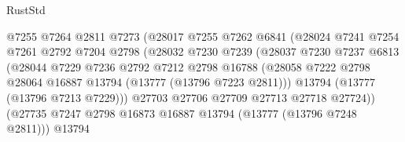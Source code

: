 \begin{lexlean}{RustStd}
\begin{coremodule}
                                    @7255
                                    @7264
                                    @2811
                                    @7273
                                    (@28017
                                      @7255
                                      @7262
                                      @6841
                                      (@28024
                                        @7241
                                        @7254
                                        @7261
                                        @2792
                                        @7204
                                        @2798
                                        (@28032
                                          @7230
                                          @7239
                                          (@28037
                                            @7230
                                            @7237
                                            @6813
                                            (@28044
                                              @7229
                                              @7236
                                              @2792
                                              @7212
                                              @2798
                                              @16788
                                              (@28058
                                                @7222
                                                @2798
                                                @28064
                                                @16887
                                                @13794
                                                (@13777 (@13796 @7223 @2811)))
                                              @13794
                                              (@13777 (@13796 @7213 @7229)))
                                            @27703
                                            @27706
                                            @27709
                                            @27713
                                            @27718
                                            @27724))
                                        (@27735
                                          @7247
                                          @2798
                                          @16873
                                          @16887
                                          @13794
                                          (@13777 (@13796 @7248 @2811)))
                                        @13794

\end{coremodule}
\end{lexlean}

